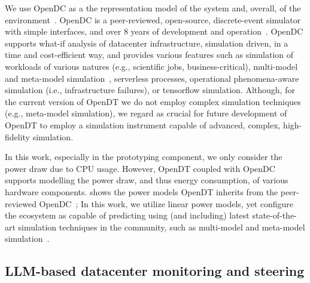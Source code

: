 We use OpenDC as a the representation model of the system and, overall, of the environment~\cite{DBLP:conf/ccgrid/MastenbroekAJLB21}. OpenDC is a peer-reviewed, open-source, discrete-event simulator with simple interfaces, and over 8 years of development and operation~\cite{nicolae5377101m3sa}. OpenDC supports what-if analysis of datacenter infrastructure, simulation driven, in a time and cost-efficient way, and provides various features such as simulation of workloads of various natures (e.g., scientific jobs, business-critical), multi-model and meta-model simulation~\cite{nicolae5377101m3sa}, serverless processes, operational phenomena-aware simulation (i.e., infrastructure failures), or tensorflow simulation. Although, for the current version of OpenDT we do not employ complex simulation techniques (e.g., meta-model simulation), we regard as crucial for future development of OpenDT to employ a simulation instrument capable of advanced, complex, high-fidelity simulation.

In this work, especially in the prototyping component, we only consider the power draw due to CPU usage. 
However, OpenDT coupled with OpenDC supports modelling the power draw, and thus energy consumption, of various hardware components.  shows the power models OpenDT inherits from the peer-reviewed OpenDC~\cite{DBLP:conf/ccgrid/MastenbroekAJLB21}; In this work, we utilize linear power models, yet configure the ecosystem as capable of predicting using (and including) latest state-of-the-art simulation techniques in the community, such as multi-model and meta-model simulation~\cite{nicolae5377101m3sa}.



\subsection{LLM-based datacenter monitoring and steering}\label{sec:design:llm}

